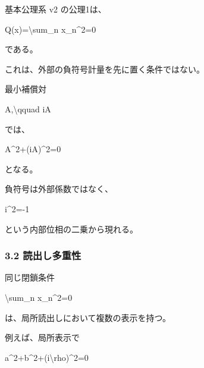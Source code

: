 \documentclass[
  a4paper,
]{article}
\newenvironment{Shaded}{}{}
\newcommand{\NormalTok}[1]{#1}
\begin{document}
基本公理系 v2 の公理1は、

\begin{Shaded}
\begin{Highlighting}[]
\NormalTok{Q(x)=\textbackslash{}sum\_n x\_n\^{}2=0}
\end{Highlighting}
\end{Shaded}

である。

これは、外部の負符号計量を先に置く条件ではない。

最小補償対

\begin{Shaded}
\begin{Highlighting}[]
\NormalTok{A,\textbackslash{}qquad iA}
\end{Highlighting}
\end{Shaded}

では、

\begin{Shaded}
\begin{Highlighting}[]
\NormalTok{A\^{}2+(iA)\^{}2=0}
\end{Highlighting}
\end{Shaded}

となる。

負符号は外部係数ではなく、

\begin{Shaded}
\begin{Highlighting}[]
\NormalTok{i\^{}2={-}1}
\end{Highlighting}
\end{Shaded}

という内部位相の二乗から現れる。

\subsubsection{3.2
読出し多重性}\label{ux8aadux51faux3057ux591aux91cdux6027}

同じ閉鎖条件

\begin{Shaded}
\begin{Highlighting}[]
\NormalTok{\textbackslash{}sum\_n x\_n\^{}2=0}
\end{Highlighting}
\end{Shaded}

は、局所読出しにおいて複数の表示を持つ。

例えば、局所表示で

\begin{Shaded}
\begin{Highlighting}[]
\NormalTok{a\^{}2+b\^{}2+(i\textbackslash{}rho)\^{}2=0}
\end{Highlighting}
\end{Shaded}
\end{document}
